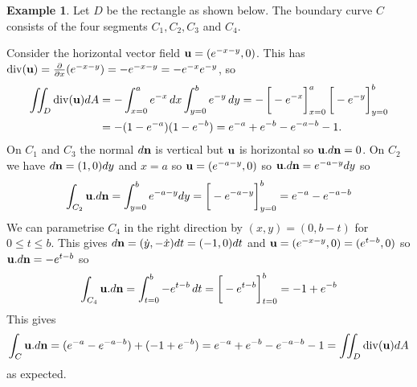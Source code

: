 \documentclass[reqno]{amsart}
\theoremstyle{definition}
\newtheorem{example}[theorem]{Example}
\begin{document}
\begin{example}
 Let $D$ be the rectangle as shown below.  The boundary curve $C$
 consists of the four segments $C_1,C_2,C_3$ and $C_4$.
 \begin{center}
 \end{center}
 Consider the horizontal vector field $\mathbf{u}=(e^{-x-y},0)$.
 This has $\operatorname{div}(\mathbf{u})=\frac{\partial}{\partial x}(e^{-x-y})=-e^{-x-y}=-e^{-x}e^{-y}$, so
 \begin{align*}
  \iint_D \dv(\vu)dA 
   &= -\int_{x=0}^ae^{-x}\,dx\int_{y=0}^be^{-y}\,dy
    = -\CH{-e^{-x}}_{x=0}^a \CH{-e^{-y}}_{y=0}^b \\
   &= -(1-e^{-a})(1-e^{-b})
    = e^{-a} + e^{-b} - e^{-a-b} - 1.
 \end{align*}
 On $C_1$ and $C_3$ the normal $d\mathbf{n}$ is vertical but $\mathbf{u}$ is
 horizontal so $\mathbf{u}.d\mathbf{n}=0$.  On $C_2$ we have $d\mathbf{n}=(1,0)dy$ and
 $x=a$ so $\mathbf{u}=(e^{-a-y},0)$ so $\mathbf{u}.d\mathbf{n}=e^{-a-y}dy$ so
 \[ \int_{C_2}\vu.d\vn=\int_{y=0}^be^{-a-y}dy
      =\CH{-e^{-a-y}}_{y=0}^b=e^{-a}-e^{-a-b}
 \]
 We can parametrise $C_4$ in the right direction by $(x,y)=(0,b-t)$
 for $0\leq t\leq b$. This gives $d\mathbf{n}=(\dot{y},-\dot{x})dt=(-1,0)dt$
 and $\mathbf{u}=(e^{-x-y},0)=(e^{t-b},0)$ so $\mathbf{u}.d\mathbf{n}=-e^{t-b}$ so
 \[ \int_{C_4}\vu.d\vn
    =\int_{t=0}^b-e^{t-b}\,dt
    =\CH{-e^{t-b}}_{t=0}^b
    =-1+e^{-b}
 \]
 This gives
 \[ \int_C\mathbf{u}.d\mathbf{n} = (e^{-a}-e^{-a-b}) + (-1+e^{-b})
     = e^{-a}+e^{-b}-e^{-a-b}-1
     = \iint_D\operatorname{div}(\mathbf{u})dA
 \]
 as expected.
\end{example}
\end{document}
